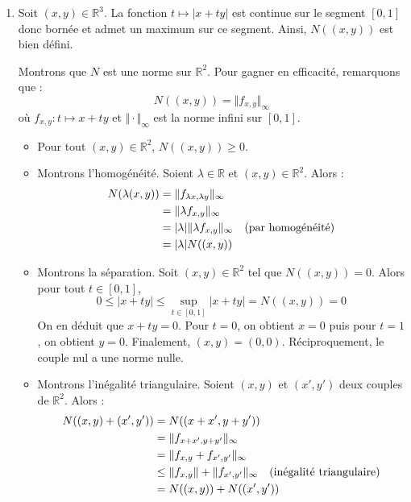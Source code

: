 \documentclass[a4paper,10pt]{report}
\begin{document}
\corr 

\begin{enumerate}
\item Soit $(x,y) \in \mathbb{R}^3$. La fonction $t \mapsto \vert x+ty \vert$ est continue sur le segment $[0,1]$ donc bornée et admet un maximum sur ce segment. Ainsi, $N((x,y))$ est bien défini.

\medskip

\noindent Montrons que $N$ est une norme sur $\mathbb{R}^2$. Pour gagner en efficacité, remarquons que :
$$ N((x,y)) = \Vert f_{x,y} \Vert_{\infty}$$
où $f_{x,y} : t \mapsto x+ty$ et $\Vert \cdot \Vert_{\infty}$ est la norme infini sur $[0,1]$.

\begin{itemize}
\item Pour tout $(x,y) \in \mathbb{R}^2$, $N((x,y)) \geq 0$.
\item Montrons l'homogénéité. Soient $\lambda \in \mathbb{R}$ et $(x,y) \in \mathbb{R}^2$. Alors :
\begin{align*}
N(\lambda (x,y)) & = \Vert f_{\lambda x, \lambda y} \Vert_{\infty} \\
& = \Vert \lambda f_{x,y} \Vert_{\infty} \\
& = \vert \lambda \vert \Vert \lambda f_{x,y} \Vert_{\infty} \quad \hbox{(par homogénéité)} \\
& = \vert \lambda \vert N((x,y)) 
\end{align*}
\item Montrons la séparation. Soit $(x,y) \in \mathbb{R}^2$ tel que $N((x,y))=0$. Alors pour tout $t \in [0,1]$,
$$ 0 \leq \vert x+ty \vert \leq \sup_{t \in [0,1]} \vert x+ty \vert = N((x,y))=0 $$
On en déduit que $x+ty=0$. Pour $t=0$, on obtient $x=0$ puis pour $t=1$, on obtient $y=0$. Finalement, $(x,y)=(0,0)$. Réciproquement, le couple nul a une norme nulle.
\item Montrons l'inégalité triangulaire. Soient $(x,y)$ et $(x',y')$ deux couples de $\mathbb{R}^2$. Alors :
\begin{align*}
N((x,y)+(x',y')) & = N((x+x',y+y')) \\
& = \Vert f_{x+x',y+y'} \Vert_{\infty} \\
& = \Vert f_{x,y} + f_{x',y'} \Vert_{\infty} \\
& \leq \Vert f_{x,y} \Vert + \Vert f_{x',y'} \Vert_{\infty} \quad \hbox{(inégalité triangulaire)} \\
& = N((x,y))+ N((x',y')) 
\end{align*}
\end{itemize}

\end{enumerate}
\end{document}

